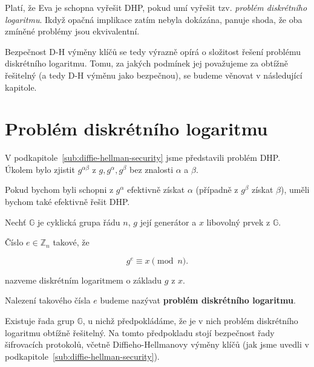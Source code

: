 \documentclass[
  program=infoi,
  biblatex,
  figures=false,
  glossaries,
  index
]{kidiplom}
\begin{document}

        Platí, že Eva je schopna vyřešit DHP, pokud umí vyřešit tzv. \emph{problém diskrétního logaritmu}.
        Ikdyž opačná implikace zatím nebyla dokázána, panuje shoda, že oba zmíněné problémy jsou ekvivalentní.

        Bezpečnost D-H výměny klíčů se tedy výrazně opírá o složitost řešení problému diskrétního logaritmu.
        Tomu, za jakých podmínek jej považujeme za obtížně řešitelný (a tedy D-H výměnu jako bezpečnou), se budeme věnovat v následující kapitole.
    

\section{Problém diskrétního logaritmu}\label{sec:discrete-log}
    
    V podkapitole~\ref{sub:diffie-hellman-security} jsme představili problém DHP.
    Úkolem bylo zjistit $g^{\alpha \beta}$ z $g, g^\alpha, g^\beta$ bez znalosti $\alpha$ a $\beta$.

    Pokud bychom byli schopni z $g^\alpha$ efektivně získat $\alpha$ (případně z $g^\beta$ získat $\beta$), uměli bychom také
    efektivně řešit DHP.

    \begin{definition}\label{def:dlp}
        
        Nechť $\mathbb{G}$ je cyklická grupa řádu $n$, $g$ její generátor a $x$ libovolný prvek z $\mathbb{G}$.

        Číslo $e \in \mathbb{Z}_n$ takové, že

            \begin{equation}\label{eq:discrete-log}
                g^e \equiv x \pmod{n}.
            \end{equation}
        
        nazveme diskrétním logaritmem o základu $g$ z $x$.

        Nalezení takového čísla $e$ budeme nazývat \textbf{problém diskrétního logaritmu}.

    \end{definition}
    
    Existuje řada grup $\mathbb{G}$, u nichž předpokládáme, že je v nich problém diskrétního logaritmu obtížně řešitelný.
    Na tomto předpokladu stojí bezpečnost řady šifrovacích protokolů, včetně Diffieho-Hellmanovy výměny klíčů
    (jak jsme uvedli v podkapitole~\ref{sub:diffie-hellman-security}).
\end{document}
